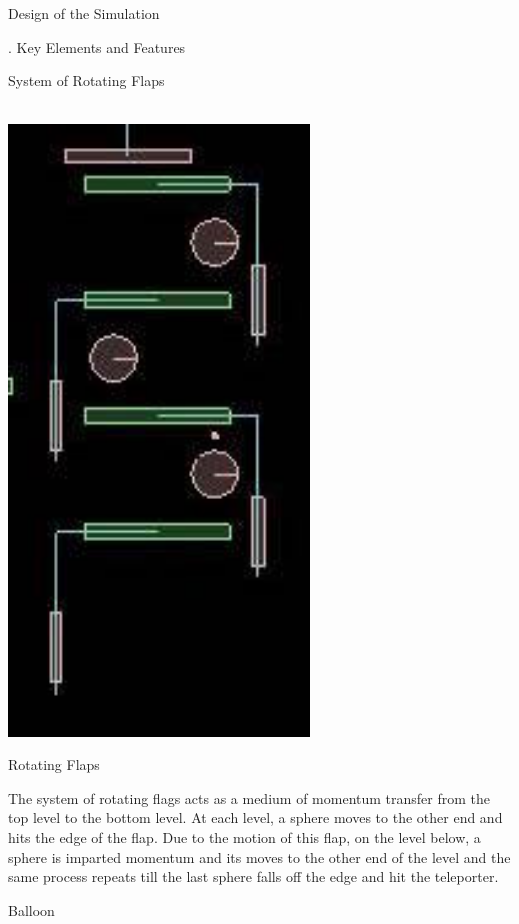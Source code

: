 \documentclass[a4paper,11pt]{resume}
\begin{document}
\begin{rSection}{{\heading Design of the Simulation}}
\begin{rSubsection}{{. Key Elements and Features}}{}{}{}
\begin{rSubsection}{{ System of Rotating Flaps}}{}{}{}
\\ \\
\begin{minipage}{0.15\textwidth}
\centering
\includegraphics[width=0.6\textwidth,scale=0.4]{flaps.jpg}
\label{fig:find}
\caption{Rotating Flaps}
\end{minipage}
\begin{minipage}{0.80\textwidth}
 The system of rotating flags acts as a medium of momentum transfer from the top level to the bottom level. At each level, a sphere moves to the other end and hits the edge of the flap. Due to the motion of this flap, on the level below, a sphere is imparted momentum and its moves to the other end of the level and the same process repeats till the last sphere falls off the edge and hit the teleporter.
 \end{minipage}
\end{rSubsection}

\begin{rSubsection}{{ Balloon}}{}{}{}


\end{rSubsection}
\end{rSubsection}
\end{rSection}
\end{document}
